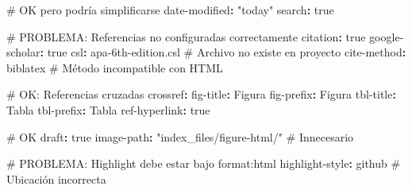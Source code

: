 \documentclass[
  doc,
  floatsintext,
  longtable,
  a4paper,
  nolmodern,
  notxfonts,
  notimes,
  12pt,
  colorlinks=true,linkcolor=blue,citecolor=blue,urlcolor=blue]{apa7}
\newenvironment{Shaded}{\begin{snugshade}}{\end{snugshade}}
\newcommand{\AttributeTok}[1]{\textcolor[rgb]{0.40,0.45,0.13}{#1}}
\newcommand{\CharTok}[1]{\textcolor[rgb]{0.13,0.47,0.30}{#1}}
\newcommand{\CommentTok}[1]{\textcolor[rgb]{0.37,0.37,0.37}{#1}}
\newcommand{\FunctionTok}[1]{\textcolor[rgb]{0.28,0.35,0.67}{#1}}
\newcommand{\KeywordTok}[1]{\textcolor[rgb]{0.00,0.23,0.31}{\textbf{#1}}}
\newcommand{\StringTok}[1]{\textcolor[rgb]{0.13,0.47,0.30}{#1}}
\begin{document}
\begin{Shaded}
\begin{Highlighting}[]
\CommentTok{\# OK pero podría simplificarse}
\FunctionTok{date{-}modified}\KeywordTok{:}\AttributeTok{ }\StringTok{"today"}\AttributeTok{  }
\FunctionTok{search}\KeywordTok{:}\AttributeTok{ }\CharTok{true}\AttributeTok{  }

\CommentTok{\#  PROBLEMA: Referencias no configuradas correctamente}
\FunctionTok{citation}\KeywordTok{:}\AttributeTok{ }\CharTok{true}\AttributeTok{  }
\FunctionTok{google{-}scholar}\KeywordTok{:}\AttributeTok{ }\CharTok{true}\AttributeTok{  }
\FunctionTok{csl}\KeywordTok{:}\AttributeTok{ apa{-}6th{-}edition.csl}\CommentTok{  \#  Archivo no existe en proyecto}
\FunctionTok{cite{-}method}\KeywordTok{:}\AttributeTok{ biblatex}\CommentTok{     \#  Método incompatible con HTML}

\CommentTok{\# OK: Referencias cruzadas}
\FunctionTok{crossref}\KeywordTok{:}
\AttributeTok{  }\FunctionTok{fig{-}title}\KeywordTok{:}\AttributeTok{ Figura  }
\AttributeTok{  }\FunctionTok{fig{-}prefix}\KeywordTok{:}\AttributeTok{ Figura  }
\AttributeTok{  }\FunctionTok{tbl{-}title}\KeywordTok{:}\AttributeTok{ Tabla  }
\AttributeTok{  }\FunctionTok{tbl{-}prefix}\KeywordTok{:}\AttributeTok{ Tabla  }
\AttributeTok{  }\FunctionTok{ref{-}hyperlink}\KeywordTok{:}\AttributeTok{ }\CharTok{true}\AttributeTok{  }

\CommentTok{\# OK}
\FunctionTok{draft}\KeywordTok{:}\AttributeTok{ }\CharTok{true}\AttributeTok{  }
\FunctionTok{image{-}path}\KeywordTok{:}\AttributeTok{ }\StringTok{"index\_files/figure{-}html/"}\CommentTok{  \#  Innecesario}

\CommentTok{\#  PROBLEMA: Highlight debe estar bajo format:html}
\FunctionTok{highlight{-}style}\KeywordTok{:}\AttributeTok{ github}\CommentTok{   \#  Ubicación incorrecta}


\end{Highlighting}
\end{Shaded}
\end{document}

